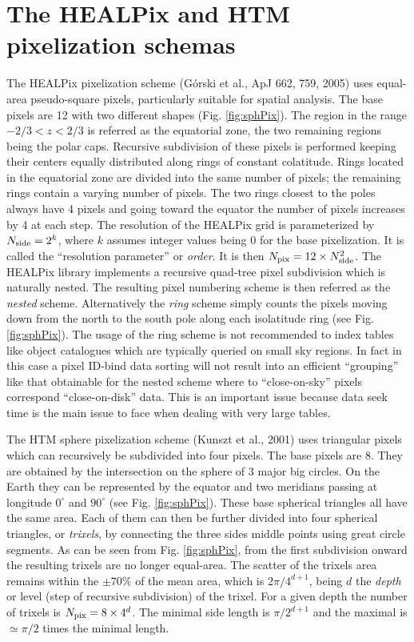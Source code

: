 \documentclass[10pt,titlepage]{article}
\def\deg{^\circ}
\begin{document}
\section{The HEALPix and HTM pixelization schemas}
\label{sec:pixschema}
The HEALPix pixelization scheme (G\'orski et al., ApJ 662, 759, 2005)
uses equal-area pseudo-square pixels,
particularly suitable for spatial analysis.
The base pixels are 12 with two different shapes (Fig. \ref{fig:sphPix}).
The region in the range $-2/3< z < 2/3$ is referred as
the equatorial zone, the two remaining regions being the polar caps.
Recursive subdivision of these pixels is performed keeping their centers
equally distributed along rings of constant colatitude. Rings located in the
equatorial zone are divided into the same number of pixels; the remaining
rings contain a varying number of pixels.  The two rings closest to the poles
always have 4 pixels and going toward the equator the number of pixels
increases by 4 at each step. The resolution of the HEALPix grid is
parameterized by $N_{\rm side} = 2^k$, where $k$ assumes integer values being
0 for the base pixelization. It is called the ``resolution parameter'' or
\emph{order}. It is then $N_{\rm pix} = 12\times N_{\rm side}^2$.
The HEALPix library implements a recursive
quad-tree pixel subdivision which is naturally nested.  The resulting pixel
numbering scheme is then referred as the \emph{nested} scheme. Alternatively
the \emph{ring} scheme simply counts the pixels moving down from the north to
the south pole along each isolatitude ring (see Fig. \ref{fig:sphPix}).
The usage of the ring scheme is not recommended to index tables like object
catalogues which are typically queried on small sky regions. In fact in this
case a pixel ID-bind data sorting will not result into an efficient
``grouping'' like that obtainable for the nested scheme where to
``close-on-sky'' pixels correspond ``close-on-disk'' data.
This is an important issue because data seek time is the main issue to face
when dealing with very large tables.

The HTM sphere pixelization scheme (Kunszt et al., 2001)
uses triangular pixels which can
recursively be subdivided into four pixels. The base pixels are 8.
They are obtained by the intersection on the sphere of 3 major big
circles. On the Earth they can be represented by the equator and two meridians
passing at longitude $0\deg$ and $90\deg$ (see Fig. \ref{fig:sphPix}).
These
base spherical triangles all have the same area.  Each of them can then be
further divided into four spherical triangles, or \emph{trixels}, by
connecting the three sides middle points using great circle segments. As can
be seen from Fig. \ref{fig:sphPix}, from the first subdivision onward the
resulting trixels
are no longer equal-area. The scatter of the trixels area remains within the
$\pm70\%$ of the mean area, which is $2\pi/4^{d+1}$, being $d$ the
\emph{depth} or level (step of recursive subdivision) of the trixel.  For a
given depth the number of trixels is $N_{\rm pix} = 8\times 4^d$.  The minimal
side length is $\pi/2^{d+1}$ and the maximal is $\simeq \pi/2$ times the
minimal length.
\end{document}

